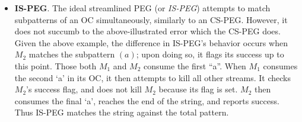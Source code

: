 \begin{itemize}
  \item \textbf{IS-PEG}. The ideal streamlined PEG (or \emph{IS-PEG}) attempts
    to match subpatterns of an OC simultaneously, similarly to an CS-PEG.
    However, it does not succumb to the above-illustrated error which the CS-PEG
    does. Given the above example, the difference in IS-PEG's behavior occurs
    when $M_2$ matches the subpattern $(a)$; upon doing so, it flags its
    success up to this point.  Those both $M_1$ and $M_2$ consume the first
    ``a''. When $M_1$ consumes the second `a' in its OC, it then attempts
    to kill all other streams. It checks $M_2$'s success flag, and does not
    kill $M_2$ because its flag is set. $M_2$ then consumes the final `a',
    reaches the end of the string, and reports success. Thus IS-PEG matches
    the string against the total pattern.

\end{itemize}

